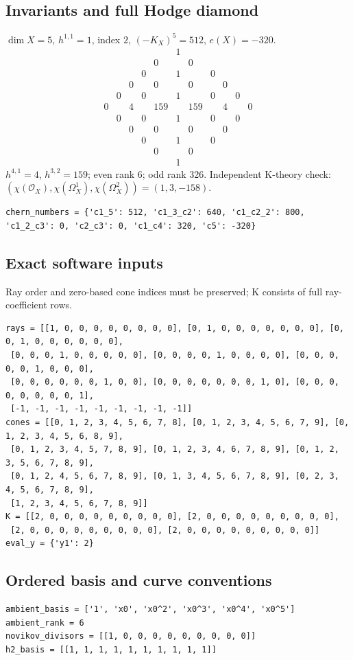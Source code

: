 \documentclass[10pt,a4paper]{article}
\begin{document}
\subsection*{Invariants and full Hodge diamond}
$\dim X=5$, $h^{1,1}=1$, index $2$, $(-K_X)^5=512$, $e(X)=-320$.
\[\begin{array}{ccccccccccc}&&&&&1&&&&&\\&&&&0&&0&&&&\\&&&0&&1&&0&&&\\&&0&&0&&0&&0&&\\&0&&0&&1&&0&&0&\\0&&4&&159&&159&&4&&0\\&0&&0&&1&&0&&0&\\&&0&&0&&0&&0&&\\&&&0&&1&&0&&&\\&&&&0&&0&&&&\\&&&&&1&&&&&\end{array}\]
$h^{4,1}=4$, $h^{3,2}=159$; even rank 6; odd rank 326.
Independent K-theory check: $(\chi(\mathcal O_X),\chi(\Omega_X^1),\chi(\Omega_X^2))=(1, 3, -158)$.
\begin{lstlisting}
chern_numbers = {'c1_5': 512, 'c1_3_c2': 640, 'c1_c2_2': 800, 'c1_2_c3': 0, 'c2_c3': 0, 'c1_c4': 320, 'c5': -320}
\end{lstlisting}
\subsection*{Exact software inputs}
Ray order and zero-based cone indices must be preserved; K consists of full ray-coefficient rows.
\begin{lstlisting}
rays = [[1, 0, 0, 0, 0, 0, 0, 0, 0], [0, 1, 0, 0, 0, 0, 0, 0, 0], [0, 0, 1, 0, 0, 0, 0, 0, 0],
 [0, 0, 0, 1, 0, 0, 0, 0, 0], [0, 0, 0, 0, 1, 0, 0, 0, 0], [0, 0, 0, 0, 0, 1, 0, 0, 0],
 [0, 0, 0, 0, 0, 0, 1, 0, 0], [0, 0, 0, 0, 0, 0, 0, 1, 0], [0, 0, 0, 0, 0, 0, 0, 0, 1],
 [-1, -1, -1, -1, -1, -1, -1, -1, -1]]
cones = [[0, 1, 2, 3, 4, 5, 6, 7, 8], [0, 1, 2, 3, 4, 5, 6, 7, 9], [0, 1, 2, 3, 4, 5, 6, 8, 9],
 [0, 1, 2, 3, 4, 5, 7, 8, 9], [0, 1, 2, 3, 4, 6, 7, 8, 9], [0, 1, 2, 3, 5, 6, 7, 8, 9],
 [0, 1, 2, 4, 5, 6, 7, 8, 9], [0, 1, 3, 4, 5, 6, 7, 8, 9], [0, 2, 3, 4, 5, 6, 7, 8, 9],
 [1, 2, 3, 4, 5, 6, 7, 8, 9]]
K = [[2, 0, 0, 0, 0, 0, 0, 0, 0, 0], [2, 0, 0, 0, 0, 0, 0, 0, 0, 0],
 [2, 0, 0, 0, 0, 0, 0, 0, 0, 0], [2, 0, 0, 0, 0, 0, 0, 0, 0, 0]]
eval_y = {'y1': 2}
\end{lstlisting}
\subsection*{Ordered basis and curve conventions}
\begin{lstlisting}
ambient_basis = ['1', 'x0', 'x0^2', 'x0^3', 'x0^4', 'x0^5']
ambient_rank = 6
novikov_divisors = [[1, 0, 0, 0, 0, 0, 0, 0, 0, 0]]
h2_basis = [[1, 1, 1, 1, 1, 1, 1, 1, 1, 1]]
\end{lstlisting}
\end{document}
